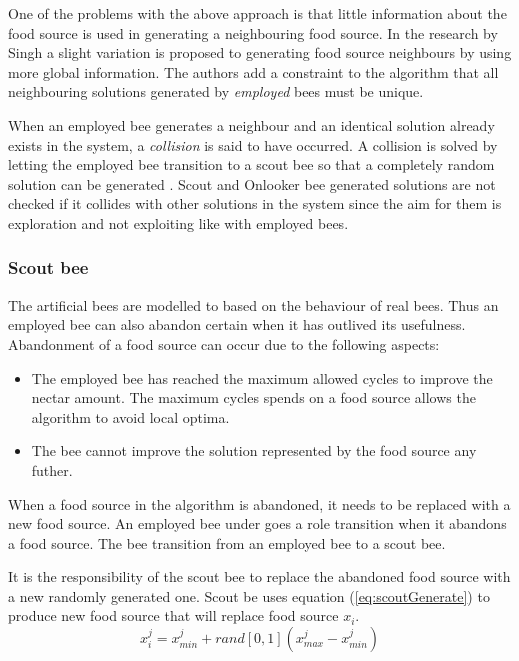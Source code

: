 One of the problems with the above approach is that little information about the food source is used in generating a neighbouring food source. In the research by Singh \cite{ABCLeafConstrained} a slight variation is proposed to generating food source neighbours by using more global information. The authors add a constraint to the algorithm that all neighbouring solutions generated by \emph{employed} bees must be unique. 

When an employed bee generates a neighbour and an identical solution already exists in the system, a \emph{collision} is said to have occurred. A collision is solved by letting the employed bee transition to a scout bee so that a completely random solution can be generated \cite{ABCLeafConstrained}. Scout and Onlooker bee generated solutions are not checked if it collides with other solutions in the system since the aim for them is exploration and not exploiting like with employed bees\cite{BeeJobShop,ABCCompareStudy}. 
\subsubsection{Scout bee}
The artificial bees are modelled to based on the behaviour of real bees. Thus an employed bee can also abandon certain when it has outlived its usefulness. Abandonment of a food source can occur due to the following aspects\cite{BeeJobShop,ABCNumericalOptimization,ABCImageEnhancement}:
\begin{itemize}
\item The employed bee has reached the maximum allowed cycles to improve the nectar amount. The maximum cycles spends on a food source allows the algorithm to avoid local optima\cite{ABCCompareStudy,ABCNumericalOptimization,ABCImageEnhancement}.
\item The bee cannot improve the solution represented by the food source any futher\cite{ABCCompareStudy,ABCNumericalOptimization,ABCImageEnhancement}.
\end{itemize}
When a food source in the algorithm is abandoned, it needs to be replaced with a new food source\cite{BeeJobShop,ABCCompareStudy,ABCImageEnhancement}. An employed bee under goes a role transition when it abandons a food source. The bee transition from an employed bee to a scout bee\cite{ABCCompareStudy,ABCNumericalOptimization,ABCImageEnhancement}. 

It is the responsibility of the scout bee to replace the abandoned food source with a new randomly generated one\cite{BeeJobShop,ABCCompareStudy,ABCImageEnhancement}. Scout be uses equation (\ref{eq:scoutGenerate}) to produce new food source that will replace food source $x_i$.
\begin{equation}
\label{eq:scoutGenerate}
x^j_i = x^j_{min} + rand[0,1](x^j_{max} - x^j_{min})
\end{equation}

